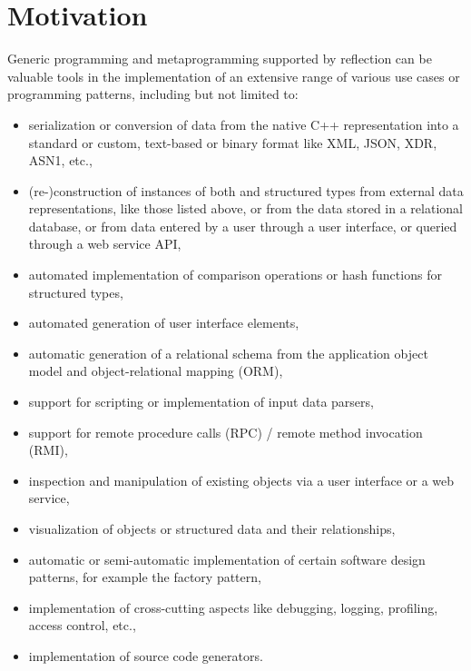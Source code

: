 \section{Motivation}

Generic programming and metaprogramming supported by reflection can be valuable
tools in the implementation of an extensive range of various use cases or
programming patterns, including but not limited to:

\begin{itemize}

\item serialization or conversion of data from the native C++ representation
into a standard or custom, text-based or binary format like XML, JSON, XDR, ASN1,
etc.,

\item (re-)construction of instances of both  and structured types
from external data representations, like those listed above, or
from the data stored in a relational database, or from data entered by
a user through a user interface, or queried through a web service API,

\item automated implementation of comparison operations or hash functions
for structured types,

\item automated generation of user interface elements,

\item automatic generation of a relational schema from the application
object model and object-relational mapping (ORM),

\item support for scripting or implementation of input data parsers,

\item support for remote procedure calls (RPC) / remote method invocation (RMI),

\item inspection and manipulation of existing objects via a user interface
or a web service,

\item visualization of objects or structured data and their relationships,

\item automatic or semi-automatic implementation of certain software design
patterns, for example the factory pattern,

\item implementation of cross-cutting aspects like debugging, logging, profiling,
access control, etc.,

\item implementation of source code generators.

\end{itemize}

